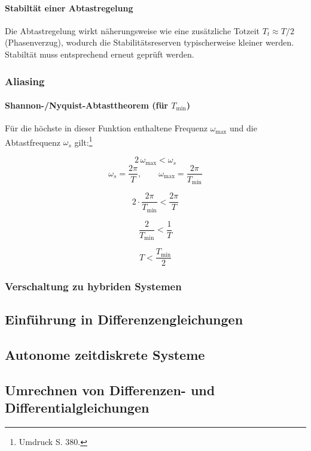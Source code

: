 \documentclass[12pt]{article}
\begin{document}
\paragraph{Stabiltät einer Abtastregelung}
\noindent Die Abtastregelung wirkt näherungsweise wie eine zusätzliche Totzeit \(T_t \approx T/2\) (Phasenverzug), wodurch die Stabilitätsreserven typischerweise kleiner werden. Stabiltät muss entsprechend erneut geprüft werden.
\subsubsection{Aliasing}

\paragraph{Shannon-/Nyquist-Abtasttheorem (für \(T_{\min}\)) }

Für die höchste in dieser Funktion enthaltene Frequenz \(\omega_{\max}\) und die Abtastfrequenz \(\omega_s\) gilt:\footnote{Umdruck S. 380.}

\[
2\,\omega_{\max} < \omega_s
\]
\[
\omega_s = \frac{2\pi}{T}, \qquad \omega_{\max} = \frac{2\pi}{T_{\min}}
\]

\[
2\cdot \frac{2\pi}{T_{\min}} < \frac{2\pi}{T}
\]

\[
\frac{2}{T_{\min}} < \frac{1}{T}
\]

\[
T < \frac{T_{\min}}{2}
\]


\subsubsection{Verschaltung zu hybriden Systemen}
\subsection{Einführung in Differenzengleichungen}
\subsection{Autonome zeitdiskrete Systeme}
\subsection{Umrechnen von Differenzen- und Differentialgleichungen}
\end{document}
